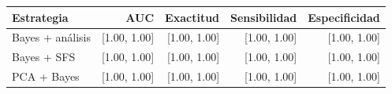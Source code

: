 \footnotesize
\begin{tabular}{lrrrr}
\toprule
Estrategia & AUC & Exactitud & Sensibilidad & Especificidad \\
\midrule
Bayes + análisis & [1.00, 1.00] & [1.00, 1.00] & [1.00, 1.00] & [1.00, 1.00] \\
Bayes + SFS & [1.00, 1.00] & [1.00, 1.00] & [1.00, 1.00] & [1.00, 1.00] \\
PCA + Bayes & [1.00, 1.00] & [1.00, 1.00] & [1.00, 1.00] & [1.00, 1.00] \\
\bottomrule
\end{tabular}
